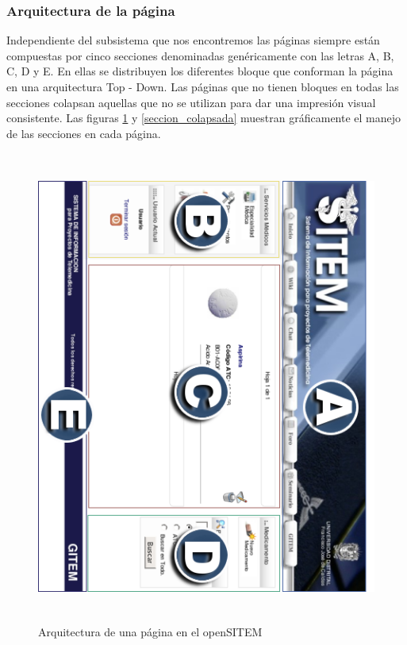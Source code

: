\subsubsection{Arquitectura de la página}

Independiente del subsistema que nos encontremos las páginas siempre están compuestas por cinco secciones denominadas genéricamente con las letras A, B, C, D y E. En ellas se distribuyen los diferentes bloque que conforman la página en una arquitectura Top - Down. Las páginas que no tienen bloques en todas las secciones colapsan aquellas que no se utilizan para dar una impresión visual consistente. Las figuras \ref{secciones} y \ref{seccion_colapsada} muestran gráficamente el manejo de las secciones en cada página.

\begin{figure}
 \centering
 \includegraphics[width=156mm, height=156mm]{secciones.png}
 \caption{Arquitectura de una página en el openSITEM}
 \label{secciones}
\end{figure}

